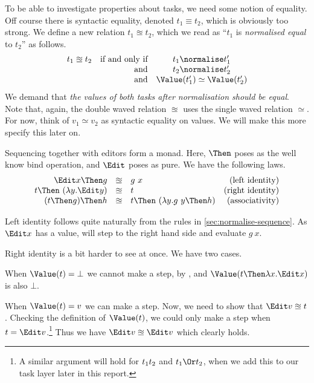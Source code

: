 To be able to investigate properties about tasks,
we need some notion of equality.
Off course there is syntactic equality,
denoted $t_1 \equiv t_2$,
which is obviously too strong.
We define a new relation $t_1 \approxeq t_2$,
which we read as \enquote{$t_1$ is \emph{normalised equal} to $t_2$} as follows.
\begin{equation*}
  \begin{array}{crc}
    t_1 \approxeq t_2 &\text{if and only if}& t_1 \normalise t_1' \\
                      &\text{and}           & t_2 \normalise t_2' \\
                      &\text{and}           & \Value(t_1') \simeq \Value(t_2') \\
  \end{array}
\end{equation*}
We demand that \emph{the values of both tasks after normalisation should be equal}.
Note that, again, the double waved relation $\approxeq$ uses the single waved relation $\simeq$.
For now,
think of $v_1 \simeq v_2$ as syntactic equality on values.
We will make this more specify this later on.

Sequencing together with editors form a monad.
Here, $\Then$ poses as the well know bind operation,
and $\Edit$ poses as pure.
We have the following laws.
\begin{equation*}
  \begin{array}{rclr}
    \Edit x \Then g
      &\approxeq& g\ x
      & \text{(left identity)} \\
    t \Then\ (\lambda y. \Edit y)
      &\approxeq& t
      & \text{(right identity)} \\
    (t \Then g) \Then h
      &\approxeq& t \Then\ (\lambda y. g\ y \Then h)
      & \text{(associativity)}
  \end{array}
\end{equation*}

Left identity follows quite naturally from the rules in \autoref{sec:normalise-sequence}.
As $\Edit x$ has a value,
 will step to the right hand side and evaluate $g\ x$.

Right identity is a bit harder to see at once.
We have two cases.
\begin{enumerate*}
  \item
    When $\Value(t) = \bot$ we cannot make a step, by ,
    and $\Value(t \Then \lambda x. \Edit x)$ is also $\bot$.
  \item
    When $\Value(t) = v$ we can make a step.
    Now, we need to show that $\Edit v \approxeq t$.
    Checking the definition of $\Value(t)$,
    we could only make a step when $t = \Edit v$.\footnote{
      A similar argument will hold for $t_1 \relax t_2$ and $t_1 \Or t_2$,
      when we add this to our task layer later in this report.
    }
    Thus we have $\Edit v \approxeq \Edit v$ which clearly holds.
\end{enumerate*}

